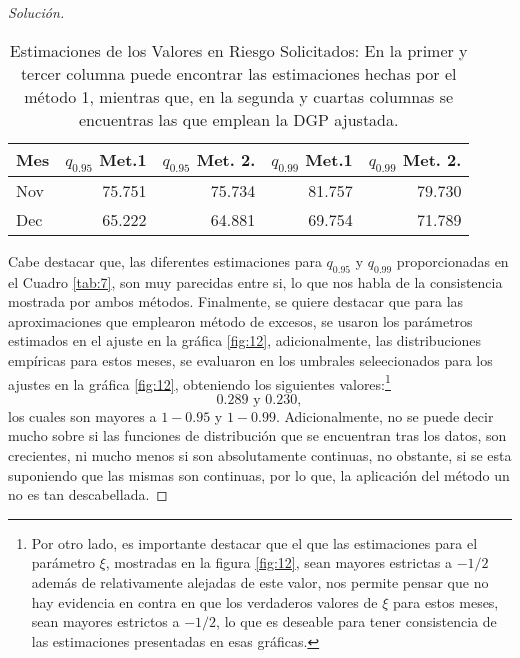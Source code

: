 \documentclass[10.5pt,notitlepage]{article}
\newenvironment{solucion}
  {\begin{proof}[Solución]}
  {\end{proof}}
\theoremstyle{plain}
\begin{document}
\begin{solucion}
\begin{table}[H]
        \centering
        \begin{tabular}{@{}l@{\hskip 0.3in}r@{\hskip 0.3in}r@{\hskip 0.3in}r@{\hskip 0.3in}r@{}}
        \toprule
         Mes & \(q_{0.95}\) Met.1 & \(q_{0.95}\) Met. 2. & \(q_{0.99}\) Met.1 & \(q_{0.99}\) Met. 2.  \\
        \midrule         
        Nov&75.751&75.734& 81.757 &79.730\\
        Dec&65.222&64.881& 69.754&71.789\\
        \end{tabular}
        \caption{Estimaciones de los Valores en Riesgo Solicitados: En la primer y tercer columna puede encontrar las estimaciones hechas por el método 1, mientras que, en la segunda y cuartas columnas se encuentras las que emplean la DGP ajustada.}
        \label{tab:7}
\end{table}
Cabe destacar que, las diferentes estimaciones para \(q_{0.95}\) y \(q_{0.99}\) proporcionadas en el Cuadro \eqref{tab:7}, son muy parecidas entre si, lo que nos habla de la consistencia mostrada por ambos métodos. Finalmente, se quiere destacar que para las aproximaciones que emplearon método de excesos, se usaron los parámetros estimados en el ajuste en la gráfica \ref{fig:12}, adicionalmente, las distribuciones empíricas para estos meses, se evaluaron en los umbrales seleecionados para los ajustes en la gráfica \ref{fig:12}, obteniendo los siguientes valores:\footnote{Por otro lado, es importante destacar que el que las estimaciones para el parámetro \(\xi\), mostradas en la figura \eqref{fig:12}, sean mayores estrictas a \(-1/2\) además de relativamente alejadas de este valor, nos permite pensar que no hay evidencia en contra en que los verdaderos valores de \(\xi\) para estos meses, sean mayores estrictos a \(-1/2\), lo que es deseable para tener consistencia de las estimaciones presentadas en esas gráficas.}
\[
0.289 \text{ y } 0.230,
\]
los cuales son mayores a \(1 - 0.95\) y \(1- 0.99\). Adicionalmente, no se puede decir mucho sobre si las funciones de distribución que se encuentran tras los datos, son crecientes, ni mucho menos si son absolutamente continuas, no obstante, si se esta suponiendo que las mismas son continuas, por lo que, la aplicación del método un no es tan descabellada.

\end{solucion}
\end{document}
